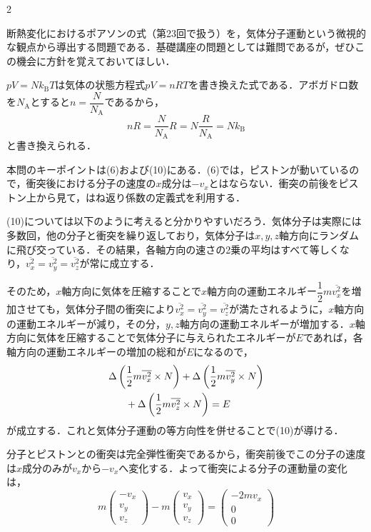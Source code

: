 \begin{multicols}{2}
\par\nopagebreak
\begin{sisin}
断熱変化におけるポアソンの式（第23回で扱う）を，気体分子運動という微視的な観点から導出する問題である．基礎講座の問題としては難問であるが，ぜひこの機会に方針を覚えておいてほしい．\par
\hspace*{1zw}$pV=Nk_{\mathrm{B}}T$は気体の状態方程式$pV=nRT$を書き換えた式である．アボガドロ数を$N_{\mathrm{A}}$とすると$n=\dfrac{N}{N_{\mathrm{A}}}$であるから，
\[nR=\frac{N}{N_{\mathrm{A}}}R=N\frac{R}{N_{\mathrm{A}}}=Nk_{\mathrm{B}}\]
と書き換えられる．\par
\hspace*{1zw}本問のキーポイントは(6)および(10)にある．(6)では，ピストンが動いているので，衝突後における分子の速度の$x$成分は$-v_x$とはならない．衝突の前後をピストン上から見て，はね返り係数の定義式を利用する．\par
\hspace*{1zw}(10)については以下のように考えると分かりやすいだろう．気体分子は実際には多数回，他の分子と衝突を繰り返しており，気体分子は$x, y, z$軸方向にランダムに飛び交っている．その結果，各軸方向の速さの2乗の平均はすべて等しくなり，$\overline{v_x^2}=\overline{v_y^2}=\overline{v_z^2}$が常に成立する．\par
\hspace*{1zw}そのため，$x$軸方向に気体を圧縮することで$x$軸方向の運動エネルギー$\dfrac{1}{2}m\overline{v_x^2}$を増加させても，気体分子間の衝突により$\overline{v_x^2}=\overline{v_y^2}=\overline{v_z^2}$が満たされるように，$x$軸方向の運動エネルギーが減り，その分，$y, z$軸方向の運動エネルギーが増加する．$x$軸方向に気体を圧縮することで気体分子に与えられたエネルギーが$E$であれば，各軸方向の運動エネルギーの増加の総和が$E$になるので，
\[\begin{aligned}
&\Delta\left(\frac{1}{2}m\overline{v_x^2}\times N\right)+\Delta\left(\frac{1}{2}m\overline{v_y^2}\times N\right)\\
&\hspace*{6mm}+\Delta\left(\frac{1}{2}m\overline{v_z^2}\times N\right)=E
\end{aligned}\]
が成立する．これと気体分子運動の等方向性を併せることで(10)が導ける．
\end{sisin}
\KaiHead
\begin{komon}
 分子とピストンとの衝突は完全弾性衝突であるから，衝突前後でこの分子の速度は$x$成分のみが$v_x$から$-v_x$へ変化する．よって衝突による分子の運動量の変化は，
       \[m\begin{pmatrix}-v_x\\ v_y\\ v_z\end{pmatrix}-m\begin{pmatrix}v_x\\ v_y\\ v_z\end{pmatrix}=\begin{pmatrix}-2mv_x\\ 0\\ 0\end{pmatrix}\]

\end{komon}
\end{multicols}
